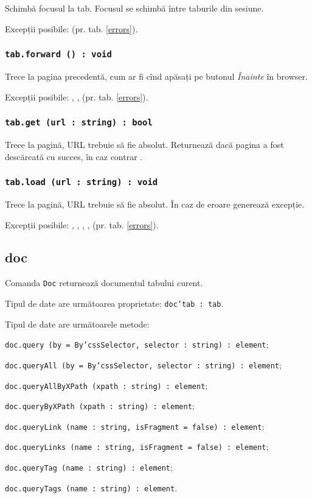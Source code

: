 Schimbă focusul la tab. Focusul se schimbă între taburile din sesiune.

Excepții posibile:  (pr. tab. \ref{errors}).

\subsubsection{\texttt{tab.forward () : void}}

Trece la pagina precedentă, cum ar fi cînd apăsați pe butonul \textit{Înainte} în browser.


Excepții posibile: , ,  (pr. tab. \ref{errors}).

\subsubsection{\texttt{tab.get (url : string) : bool}}

Trece la pagină, URL trebuie să fie absolut. Returnează \true{} dacă pagina a fost descărcată cu succes, în caz contrar \false.

\subsubsection{\texttt{tab.load (url : string) : void}}

Trece la pagină, URL trebuie să fie absolut. În caz de eroare generează excepție.

Excepții posibile: , , , ,  (pr. tab. \ref{errors}).

\subsection{{\color{orange} doc}}

Comanda \texttt{Doc} returnează documentul tabului curent.

Tipul de date \dom{} are următoarea proprietate: \texttt{doc'tab : tab}.

Tipul de date \dom{} are următoarele metode:
\begin{icItems}
	\item \texttt{doc.query (by = By'cssSelector, selector : string) : element};
	\item \texttt{doc.queryAll (by = By'cssSelector, selector : string) : element};
	\item \texttt{doc.queryAllByXPath (xpath : string) : element};
	\item \texttt{doc.queryByXPath (xpath : string) : element};
	\item \texttt{doc.queryLink (name : string, isFragment = false) : element};
	\item \texttt{doc.queryLinks (name : string, isFragment = false) : element};
	\item \texttt{doc.queryTag (name : string) : element};
	\item \texttt{doc.queryTags (name : string) : element}.
\end{icItems}

